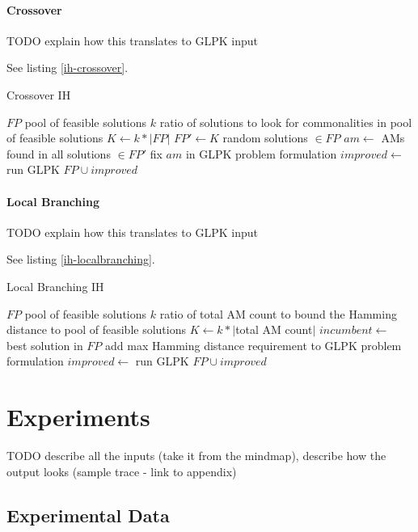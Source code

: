 \documentclass[a4paper,12pt,oneside]{report}
\begin{document}
\subsubsection{Crossover}

TODO explain how this translates to GLPK input

See listing \ref{ih-crossover}.

\begin{algorithm}
\caption{Crossover IH}
\label{ih-crossover}
\begin{algorithmic}
\REQUIRE $FP$ pool of feasible solutions
\REQUIRE $k$ ratio of solutions to look for commonalities in
\ENSURE pool of feasible solutions
\STATE $K \gets k * |FP|$
\STATE $FP' \gets K$ random solutions $\in FP$
\STATE $am \gets$ AMs found in all solutions $\in FP'$
\STATE fix $am$ in GLPK problem formulation
\STATE $improved \gets $ run GLPK
\RETURN $FP \cup improved$
\end{algorithmic}
\end{algorithm}

\subsubsection{Local Branching}

TODO explain how this translates to GLPK input

See listing \ref{ih-localbranching}.

\begin{algorithm}
\caption{Local Branching IH}
\label{ih-localbranching}
\begin{algorithmic}
\REQUIRE $FP$ pool of feasible solutions
\REQUIRE $k$ ratio of total AM count to bound the Hamming distance to
\ENSURE pool of feasible solutions
\STATE $K \gets k * |$total AM count$|$
\STATE $incumbent \gets $ best solution in $FP$ 
\STATE add max Hamming distance requirement to GLPK problem formulation
\STATE $improved \gets $ run GLPK
\RETURN $FP \cup improved$
\end{algorithmic}
\end{algorithm}

\chapter{Experiments}

TODO describe all the inputs (take it from the mindmap), describe how the output looks (sample trace - link to appendix)

\section{Experimental Data}
\end{document}
